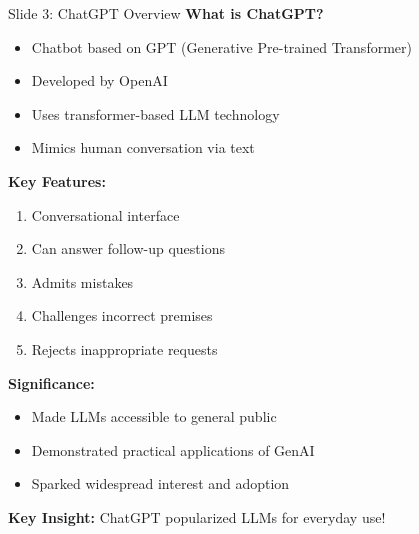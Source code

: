 \documentclass[8pt]{beamer}
\begin{document}
	\begin{frame}{Slide 3: ChatGPT Overview}
		\fontsize{6.5}{7.5}\selectfont
		\textbf{What is ChatGPT?}
		\begin{itemize}
			\item Chatbot based on GPT (Generative Pre-trained Transformer)
			\item Developed by OpenAI
			\item Uses transformer-based LLM technology
			\item Mimics human conversation via text
		\end{itemize}
		
		\vspace{0.1cm}
		\textbf{Key Features:}
		\begin{enumerate}
			\item Conversational interface
			\item Can answer follow-up questions
			\item Admits mistakes
			\item Challenges incorrect premises
			\item Rejects inappropriate requests
		\end{enumerate}
		
		\vspace{0.1cm}
		\textbf{Significance:}
		\begin{itemize}
			\item Made LLMs accessible to general public
			\item Demonstrated practical applications of GenAI
			\item Sparked widespread interest and adoption
		\end{itemize}
		
		\textcolor{myblue}{\textbf{Key Insight:}} ChatGPT popularized LLMs for everyday use!
	\end{frame}
	
\end{document}
